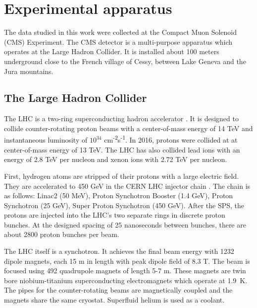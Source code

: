 \chapter{Experimental apparatus}

The data studied in this work were collected at the Compact Muon Solenoid (CMS) Experiment.
The CMS detector is a multi-purpose apparatus which operates at the Large Hadron Collider. 
It is installed about 100 meters underground close to the French village of Cessy,
between Lake Geneva and the Jura mountains.


\section{The Large Hadron Collider}

The LHC is a two-ring superconducting hadron accelerator \cite{lhcmachine}.
It is designed to collide counter-rotating proton beams with a center-of-mass energy of 14 TeV
and instantaneous luminosity of $10^{34}$ cm\textsuperscript{-2}s\textsuperscript{-1}.
In 2016, protons were collided at at center-of-mass energy of 13 TeV. 
The LHC has also collided lead ions with an energy of 2.8 TeV per nucleon and xenon ions with 2.72 TeV per nucleon.

First, hydrogen atoms are stripped of their protons with a large electric field.
They are accelerated to 450 GeV in the CERN LHC injector chain \cite{lhcinjector}.
The chain is as follows: Linac2 (50 MeV), Proton Synchotron Booster (1.4 GeV), Proton Synchotron (25 GeV), Super Proton Synchotron (450 GeV).
After the SPS, the protons are injected into the LHC's two separate rings in discrete proton bunches.
At the designed spacing of 25 nanoseconds between bunches, there are about 2800 proton bunches per beam.

The LHC itself is a synchotron. 
It achieves the final beam energy with 1232 dipole magnets, each 15 m in length with peak dipole field of 8.3 T.
The beam is focused using 492 quadrupole magnets of length 5-7 m.
These magnets are twin bore niobium-titanium superconducting electromagnets which operate at 1.9\textdegree~K.
The pipes for the counter-rotating beams are magnetically coupled and the magnets share the same cryostat.
Superfluid helium is used as a coolant.

